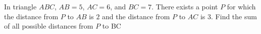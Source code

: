In triangle $ABC$, $AB = 5$, $AC = 6$, and $BC = 7$. There exists a point $P$ for which the distance from $P$ to $AB$ is $2$ and the distance from $P$ to $AC$ is $3$. Find the sum of all possible distances from $P$ to BC
